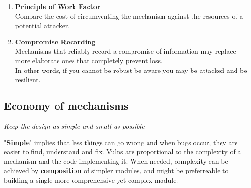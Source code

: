 {\begin{enumerate}

      \item \textbf{Principle of Work Factor}\\
      Compare the cost of circumventing the mechanism against the resources of a potential attacker.
      \item \textbf{Compromise Recording}\\
      Mechanisms that reliably record a compromise of information may replace more elaborate ones that completely prevent loss.\\
      In other words,
      if you cannot be robust be aware you may be attacked and be resilient.
   \end{enumerate}
}
\subsection{Economy of mechanisms}
\begin{center}
   \textit{Keep the design as simple and small as possible}
\end{center}

"\textbf{Simple}" implies that less things can go wrong and when bugs occur, they are easier to find, understand and fix.
Vulns are proportional to the complexity of a mechanism and the code implementing it.
When needed, complexity can be achieved by \textbf{composition} of simpler modules, and might be preferreable to building a single more comprehensive yet complex module.
